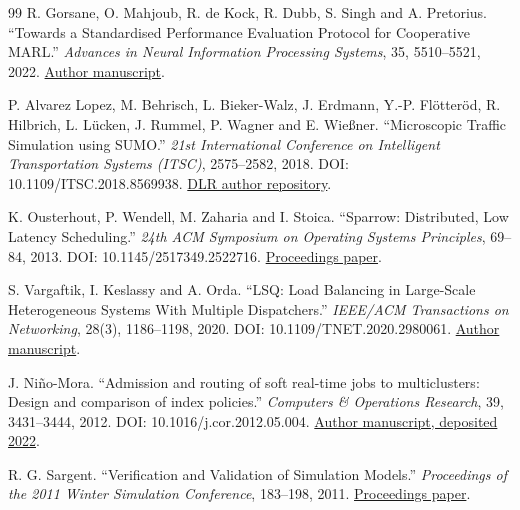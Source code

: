 \documentclass[11pt,a4paper]{article}
\begin{document}
\begin{thebibliography}{99}
 R. Gorsane, O. Mahjoub, R. de Kock, R. Dubb, S. Singh and A. Pretorius. ``Towards a Standardised Performance Evaluation Protocol for Cooperative MARL.'' \emph{Advances in Neural Information Processing Systems}, 35, 5510--5521, 2022. \href{\detokenize{https://arxiv.org/abs/2209.10485}}{Author manuscript}.

 P. Alvarez Lopez, M. Behrisch, L. Bieker-Walz, J. Erdmann, Y.-P. Flötteröd, R. Hilbrich, L. Lücken, J. Rummel, P. Wagner and E. Wießner. ``Microscopic Traffic Simulation using SUMO.'' \emph{21st International Conference on Intelligent Transportation Systems (ITSC)}, 2575--2582, 2018. DOI: 10.1109/ITSC.2018.8569938. \href{\detokenize{https://elib.dlr.de/127994/}}{DLR author repository}.

 K. Ousterhout, P. Wendell, M. Zaharia and I. Stoica. ``Sparrow: Distributed, Low Latency Scheduling.'' \emph{24th ACM Symposium on Operating Systems Principles}, 69--84, 2013. DOI: 10.1145/2517349.2522716. \href{\detokenize{https://sigops.org/s/conferences/sosp/2013/papers/p69-ousterhout.pdf}}{Proceedings paper}.

 S. Vargaftik, I. Keslassy and A. Orda. ``LSQ: Load Balancing in Large-Scale Heterogeneous Systems With Multiple Dispatchers.'' \emph{IEEE/ACM Transactions on Networking}, 28(3), 1186--1198, 2020. DOI: 10.1109/TNET.2020.2980061. \href{\detokenize{https://webee.technion.ac.il/~isaac/p/ton20_lsq.pdf}}{Author manuscript}.

 J. Niño-Mora. ``Admission and routing of soft real-time jobs to multiclusters: Design and comparison of index policies.'' \emph{Computers \& Operations Research}, 39, 3431--3444, 2012. DOI: 10.1016/j.cor.2012.05.004. \href{\detokenize{https://arxiv.org/abs/2207.12815}}{Author manuscript, deposited 2022}.

 R. G. Sargent. ``Verification and Validation of Simulation Models.'' \emph{Proceedings of the 2011 Winter Simulation Conference}, 183--198, 2011. \href{\detokenize{https://www.informs-sim.org/wsc11papers/016.pdf}}{Proceedings paper}.


\end{thebibliography}
\end{document}
